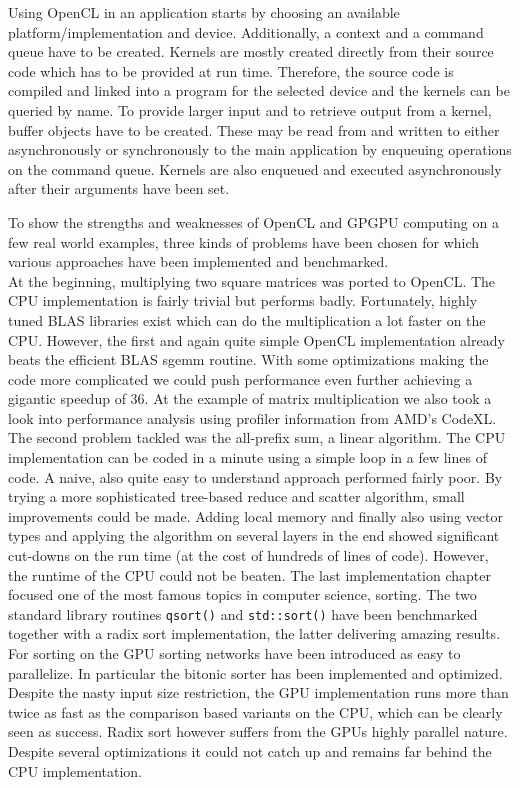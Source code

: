 Using OpenCL in an application starts by choosing an available platform/implementation and device. Additionally, a context and a command queue have to be created. Kernels are mostly created directly from their source code which has to be provided at run time. Therefore, the source code is compiled and linked into a program for the selected device and the kernels can be queried by name. To provide larger input and to retrieve output from a kernel, buffer objects have to be created. These may be read from and written to either asynchronously or synchronously to the main application by enqueuing operations on the command queue. Kernels are also enqueued and executed asynchronously after their arguments have been set.

To show the strengths and weaknesses of OpenCL and GPGPU computing on a few real world examples, three kinds of problems have been chosen for which various approaches have been implemented and benchmarked. \\
At the beginning, multiplying two square matrices was ported to OpenCL. The CPU implementation is fairly trivial but performs badly. Fortunately, highly tuned BLAS libraries exist which can do the multiplication a lot faster on the CPU. However, the first and again quite simple OpenCL implementation already beats the efficient BLAS sgemm routine. With some optimizations making the code more complicated we could push performance even further achieving a gigantic speedup of 36.
At the example of matrix multiplication we also took a look into performance analysis using profiler information from AMD's CodeXL.
The second problem tackled was the all-prefix sum, a linear algorithm. The CPU implementation can be coded in a minute using a simple loop in a few lines of code. A naive, also quite easy to understand approach performed fairly poor. By trying a more sophisticated tree-based reduce and scatter algorithm, small improvements could be made. Adding local memory and finally also using vector types and applying the algorithm on several layers in the end showed significant cut-downs on the run time (at the cost of hundreds of lines of code). However, the runtime of the CPU could not be beaten.
The last implementation chapter focused one of the most famous topics in computer science, sorting. The two standard library routines \lstinline!qsort()! and \lstinline!std::sort()! have been benchmarked together with a radix sort implementation, the latter delivering amazing results. For sorting on the GPU sorting networks have been introduced as easy to parallelize. In particular the bitonic sorter has been implemented and optimized. Despite the nasty input size restriction, the GPU implementation runs more than twice as fast as the comparison based variants on the CPU, which can be clearly seen as success. Radix sort however suffers from the GPUs highly parallel nature. Despite several optimizations it could not catch up and remains far behind the CPU implementation.


